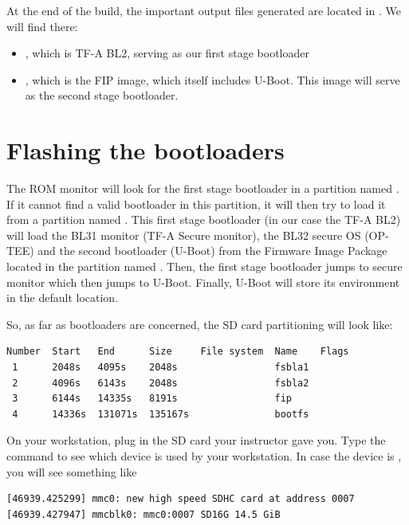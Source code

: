 At the end of the build, the important output files generated are
located in . We will find there:

\begin{itemize}

\item {}, which is TF-A BL2, serving as
  our first stage bootloader

\item {}, which is the FIP image, which itself includes
  U-Boot. This image will serve as the second stage bootloader.

\end{itemize}

\section{Flashing the bootloaders}

The ROM monitor will look for the first stage bootloader in a
partition named . If it cannot find a valid bootloader in
this partition, it will then try to load it from a partition named
. This first stage bootloader (in our case the TF-A BL2)
will load the BL31 monitor (TF-A Secure monitor), the BL32 secure OS (OP-TEE)
and the second bootloader (U-Boot) from the Firmware Image
Package located in the partition named .
Then, the first stage bootloader jumps to secure monitor which then jumps to U-Boot.
Finally, U-Boot will store its environment in the default location.

So, as far as bootloaders are concerned, the SD card partitioning will
look like:

\begin{verbatim}
Number  Start   End      Size     File system  Name    Flags
 1      2048s   4095s    2048s                 fsbla1
 2      4096s   6143s    2048s                 fsbla2
 3      6144s   14335s   8191s                 fip
 4      14336s  131071s  135167s               bootfs
\end{verbatim}

On your workstation, plug in the SD card your instructor gave you. Type
the  command to see which device is used by your
workstation. In case the device is , you will see
something like

\begin{verbatim}
[46939.425299] mmc0: new high speed SDHC card at address 0007
[46939.427947] mmcblk0: mmc0:0007 SD16G 14.5 GiB
\end{verbatim}

